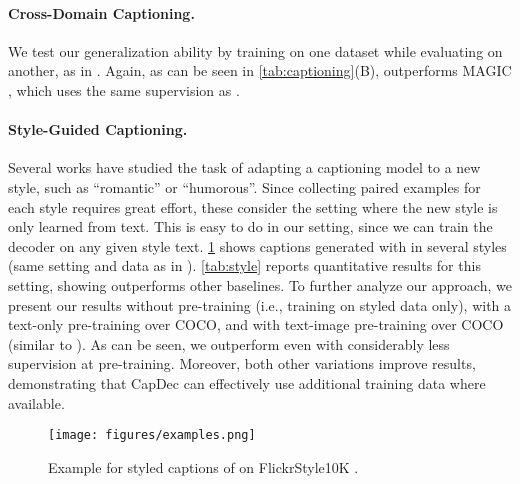 \paragraph{Cross-Domain Captioning.}
We test our generalization ability by training on one dataset while evaluating on another, as in  \citet{su2022language}. Again, as can be seen in \cref{tab:captioning}(B), \modelname{} outperforms MAGIC \cite{su2022language}, which uses the same supervision as \modelname{}.





\paragraph{Style-Guided Captioning.}
Several works \cite{zhao2020memcap,gan2017stylenet} have studied the task of adapting a captioning model to a new style, such as ``romantic'' or ``humorous''. Since collecting paired examples for each style requires great effort, these consider the setting where the new style is only learned from text. This is easy to do in our setting, since we can train the decoder on any given style text. \cref{figures:examples.png} shows captions generated with \modelname{} in several styles (same setting and data as in \citet{zhao2020memcap}). \cref{tab:style} reports quantitative results for this setting, showing \modelname{} outperforms other baselines. To further analyze our approach, we present our results without pre-training (i.e., training on styled data only), with a text-only pre-training over COCO, and with text-image pre-training over COCO (similar to \cite{zhao2020memcap}). As can be seen, we outperform \cite{zhao2020memcap} even with considerably less supervision at pre-training. Moreover, both other variations improve results, demonstrating that CapDec can effectively use additional training data where available.











\begin{figure}
\centering
\texttt{[image: figures/examples.png]}
\vspace{-0.35cm}
\caption{Example for styled captions of \modelname{} on FlickrStyle10K \cite{gan2017stylenet}.}
\vspace{-0.45cm}
\label{figures:examples.png}
\end{figure}

